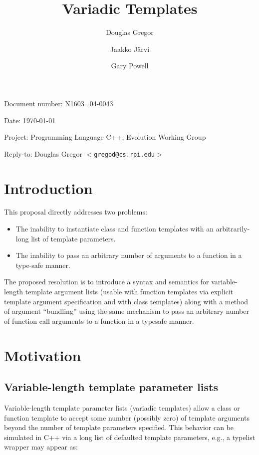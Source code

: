 \documentclass{article}
\begin{document}
\pagestyle{myheadings}

\title{Variadic Templates}
\author{Douglas Gregor \and Jaakko J\"arvi \and Gary Powell}
\date{}
\maketitle

\par\noindent Document number: N1603=04-0043
\par\noindent Date: \today
\par\noindent Project: Programming Language C++, Evolution Working Group
\par\noindent Reply-to: Douglas Gregor $<${\tt gregod@cs.rpi.edu}$>$

\section{Introduction}
This proposal directly addresses two problems:
\begin{itemize}
\item The inability to instantiate class and function templates with an arbitrarily-long list of template parameters.
\item The inability to pass an arbitrary number of arguments to a function in a type-safe manner.
\end{itemize}

The proposed resolution is to introduce a syntax and semantics for
variable-length template argument lists (usable with function templates
via explicit template argument specification and with class templates)
along with a method of argument ``bundling'' using the same mechanism to
pass an arbitrary number of function call arguments to a function in a
typesafe manner.

\section{Motivation}
\subsection{Variable-length template parameter lists}
Variable-length template parameter lists (variadic templates) allow a class or
function template to accept some number (possibly zero) of template
arguments beyond the number of template parameters specified. This
behavior can be simulated in C++ via a long list of defaulted template
parameters, e.g., a typelist wrapper may appear as:
\end{document}
